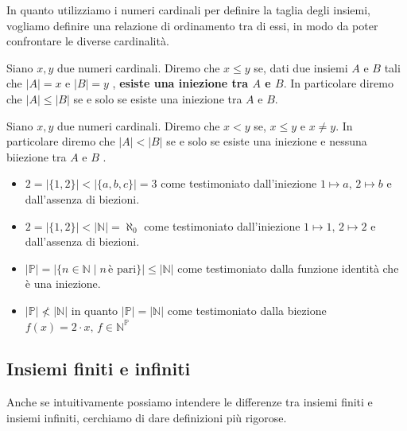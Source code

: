 \documentclass[
  a4paper,
]{article}
\providecommand{\tightlist}{%
  \setlength{\itemsep}{0pt}\setlength{\parskip}{0pt}}
\begin{document}
In quanto utilizziamo i numeri cardinali per definire la taglia degli
insiemi, vogliamo definire una relazione di ordinamento tra di essi, in
modo da poter confrontare le diverse cardinalità.

Siano \(x, y\) due numeri cardinali. Diremo che \(x \leq y\) se, dati
due insiemi \(A\) e \(B\) tali che \(|A| = x \text{ e } |B| = y\) ,
\textbf{esiste una iniezione tra \(A\) e \(B\)}. In particolare diremo
che \(|A| \leq |B|\) se e solo se esiste una iniezione tra \(A\) e
\(B\).

Siano \(x, y\) due numeri cardinali. Diremo che \(x < y\) se,
\(x \leq y\) e \(x \not = y\). In particolare diremo che \(|A| < |B|\)
se e solo se esiste una iniezione e nessuna biiezione tra \(A\) e \(B\)
.

\begin{examplebox}[Esempi]

\begin{itemize}
\tightlist
\item
  \(2 = \left\lvert \{1, 2\} \right\rvert < \left\lvert \{a, b, c\} \right\rvert = 3\)
  come testimoniato dall'iniezione \(1 \mapsto a, \, 2 \mapsto b\) e
  dall'assenza di biezioni.
\item
  \(2 = \left\lvert \{1, 2\} \right\rvert < \left\lvert\mathbb{N}\right\rvert = \aleph_0\)
  come testimoniato dall'iniezione \(1 \mapsto 1, \, 2 \mapsto 2\) e
  dall'assenza di biezioni.
\item
  \(\lvert \mathbb{P} \rvert = \left\lvert \{n \in \mathbb{N} \mid n \, \text{è pari}\} \right\rvert \leq \left\lvert \mathbb{N} \right\rvert\)
  come testimoniato dalla funzione identità che è una iniezione.
\item
  \(\lvert \mathbb{P} \rvert \not < \left\lvert \mathbb{N} \right\rvert\)
  in quanto
  \(\left\lvert \mathbb{P} \right\rvert = \left\lvert \mathbb{N} \right\rvert\)
  come testimoniato dalla biezione
  \(f(x) = 2 \cdot x, \, f \in \mathbb{N}^{\mathbb{P}}\)
\end{itemize}

\end{examplebox}

\hypertarget{insiemi-finiti-e-infiniti}{%
\subsection{Insiemi finiti e infiniti}\label{insiemi-finiti-e-infiniti}}

Anche se intuitivamente possiamo intendere le differenze tra insiemi
finiti e insiemi infiniti, cerchiamo di dare definizioni più rigorose.
\end{document}
